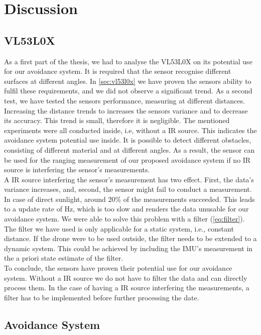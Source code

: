 \chapter{Discussion}

\section{VL53L0X}
As a first part of the thesis, we had to analyse the VL53L0X on its potential use for our avoidance system. It is required that the sensor recognise different surfaces at different angles. In \cref{sec:vl53l0x} we have proven the sensors ability to fulfil these requirements, and we did not observe a significant trend. As a second test, we have tested the sensors performance, measuring at different distances. Increasing the distance trends to increases the sensors variance and to decrease its accuracy. This trend is small, therefore it is negligible. The mentioned experiments were all conducted inside, i.e, without a IR source. This indicates the avoidance system potential use inside. It is possible to detect different obstacles, consisting of different material and at different angles. As a result, the sensor can be used for the ranging measurement of our proposed avoidance system if no IR source is interfering the sensor's measurements. \\
A IR source interfering the sensor's measurement has two effect. First, the data's variance increases, and, second, the sensor might fail to conduct a measurement. In case of direct sunlight, around 20\% of the measurements succeeded. This leads to a update rate of \unit[1]{Hz}, which is too slow and renders the data unusable for our avoidance system. We were able to solve this problem with a filter (\cref{eq:filter}). The filter we have used is only applicable for a static system, i.e., constant distance. If the drone were to be used outside, the filter needs to be extended to a dynamic system. This could be achieved by including the IMU's measurement in the a priori state estimate of the filter. \\
To conclude, the sensors have proven their potential use for our avoidance system. Without a IR source we do not have to filter the data and can directly process them. In the case of having a IR source interfering the measurements, a filter has to be implemented before further processing the date.  

\section{Avoidance System}

